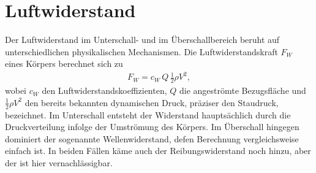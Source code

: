 %
%
%
%
\section{Luftwiderstand\label{ueberschall:section:Luftwiderstand}}
Der Luftwiderstand im Unterschall- und im Überschallbereich 
beruht auf unterschiedlichen physikalischen Mechanismen.
Die Luftwiderstandskraft $F_W$~\cite{StroemwiderWikiDE} eines Körpers 
berechnet sich zu
\begin{align*}
    F_W
    = c_W \, Q \, \frac{1}{2} \rho V^2,
\end{align*}
wobei $c_W$ den Luftwiderstandskoeffizienten, $Q$ die angeströmte 
Bezugsfläche und $\tfrac{1}{2}\rho V^2$ den bereits bekannten dynamischen Druck, 
präziser den Staudruck, bezeichnet.
Im Unterschall entsteht der Widerstand hauptsächlich durch die Druckverteilung 
infolge der Umströmung des Körpers. 
Im Überschall hingegen dominiert der sogenannte Wellenwiderstand, 
defen Berechnung vergleichsweise einfach ist.
In beiden Fällen käme auch der Reibungswiderstand noch hinzu,
aber der ist hier vernachlässigbar.

